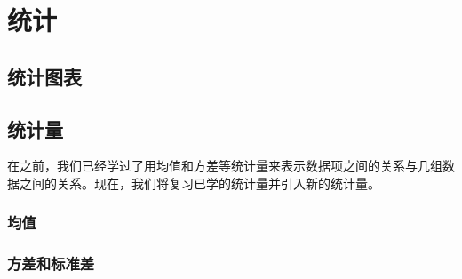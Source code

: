 \chapter{统计}

\section{统计图表}

\section{统计量}
在之前，我们已经学过了用均值和方差等统计量来表示数据项之间的关系与几组数据之间的关系。现在，我们将复习已学的统计量并引入新的统计量。

\subsection{均值}
\subsection{方差和标准差}
